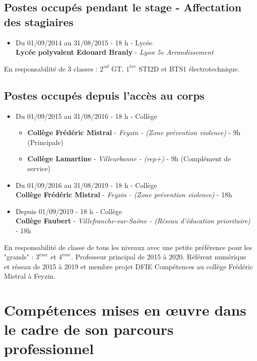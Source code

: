 \documentclass[11pt]{article}
\begin{document}
\subsection{Postes occupés pendant le stage - Affectation des stagiaires }

\begin{itemize}
  \item Du 01/09/2014 au 31/08/2015 - 18 h - Lycée\\
    \textbf{Lycée polyvalent Edouard Branly} - \textit{Lyon 5e Arrondissement} \\
\end{itemize}
En responsabilité de 3 classes : $2^{nd}$ GT, $1^{ère}$ STI2D et BTS1 électrotechnique.


\subsection{Postes occupés depuis l’accès au corps}

\begin{itemize}
  \item Du 01/09/2015 au 31/08/2016 - 18 h - Collège
  \begin{itemize}
    \item \textbf{Collège Frédéric Mistral} - \textit{Feyzin - (Zone prévention violence)} - 9h (Principale)
    \item \textbf{Collège Lamartine} - \textit{Villeurbanne - (rep+)} - 9h (Complément de service)
  \end{itemize}
  \item Du 01/09/2016 au 31/08/2019 - 18 h - Collège\\
    \textbf{Collège Frédéric Mistral} - \textit{Feyzin - (Zone prévention violence)} - 18h
  \item Depuis 01/09/2019 - 18 h - Collège\\
    \textbf{Collège Faubert} - \textit{Villefranche-sur-Saône - (Réseau d'éducation prioritaire)} - 18h \\
\end{itemize}
En responsabilité de classe de tous les niveaux avec une petite préférence pour les "grands" : $3^{ème}$ et $4^{ème}$. Professeur principal de 2015 à 2020. Référent numérique et réseau de 2015 à 2019 et membre projet DFIE Compétences au collège Frédéric Mistral à Feyzin.

\newpage

\section{Compétences mises en œuvre dans le cadre de son parcours professionnel}
\end{document}
